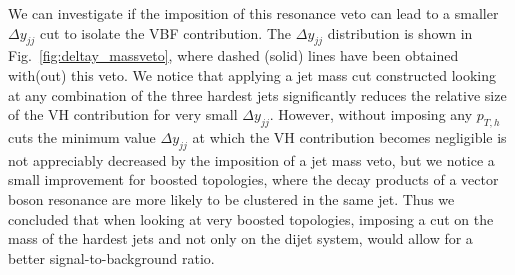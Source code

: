 \documentclass[10pt,prd,fleqn,superscriptaddress,notitlepage,nofootinbib,preprintnumbers,nobalancelastpage]{revtex4-1}
\newcommand{\VBF}{VBF\xspace}
\newcommand{\VH}{VH\xspace}
\begin{document}
We can investigate if the imposition of this resonance veto can lead to a smaller $\Delta y_{jj}$ cut to isolate the \VBF{} contribution.
The $\Delta y_{jj}$ distribution is shown in Fig.~\ref{fig:deltay_massveto}, where dashed (solid) lines have been obtained with(out) this veto.
We notice that applying a jet mass cut constructed looking at any combination of the three hardest jets significantly reduces the relative size of the \VH{} contribution for very small $\Delta y_{jj}$. However, without imposing any $p_{T,h}$ cuts the minimum value $\Delta y_{jj}$ at which the \VH{} contribution becomes negligible is not appreciably decreased by  the imposition of a jet mass veto, but we notice a small improvement for boosted topologies, where the decay products of a vector boson resonance are more likely to be clustered in the same jet.
Thus we concluded that when looking at very boosted topologies, imposing a cut on the mass of the hardest jets and not only on the dijet system, would allow for a better signal-to-background ratio.
\end{document}
